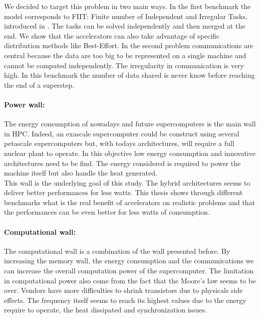 We decided to target this problem in two main ways. 
In the first benchmark the model corresponds to FIIT: Finite number of Independent and Irregular Tasks, introduced in \cite{flauzac2003confiit}.
The tasks can be solved independently and then merged at the end. 
We show that the accelerators can also take advantage of specific distribution methods like Best-Effort. 
In the second problem communications are central because the data are too big to be represented on a single machine and cannot be computed independently. 
The irregularity in communication is very high.
In this benchmark the number of data shared is never know before reaching the end of a superstep.

\paragraph{Power wall: }
The energy consumption of nowadays and future supercomputers is the main wall in HPC. 
Indeed, an exascale supercomputer could be construct using several petascale supercomputers but, with todays architectures, will require a full nuclear plant to operate. 
In this objective low energy consumption and innovative architectures need to be find. 
The energy considered is required to power the machine itself but also handle the heat generated.\\

This wall is the underlying goal of this study. 
The hybrid architectures seems to deliver better performances for less watts.
This thesis shows through different benchmarks what is the real benefit of accelerators on realistic problems and that the performances can be even better for less watts of consumption.

\paragraph{Computational wall: }
The computational wall is a combination of the wall presented before. 
By increasing the memory wall, the energy consumption and the communications we can increase the overall computation power of the supercomputer. 
The limitation in computational power also come from the fact that the Moore's law seems to be over. 
Vendors have more difficulties to shrink transistors due to physicals side effects. 
The frequency itself seems to reach its highest values due to the energy require to operate, the heat dissipated and synchronization issues.\\ 

